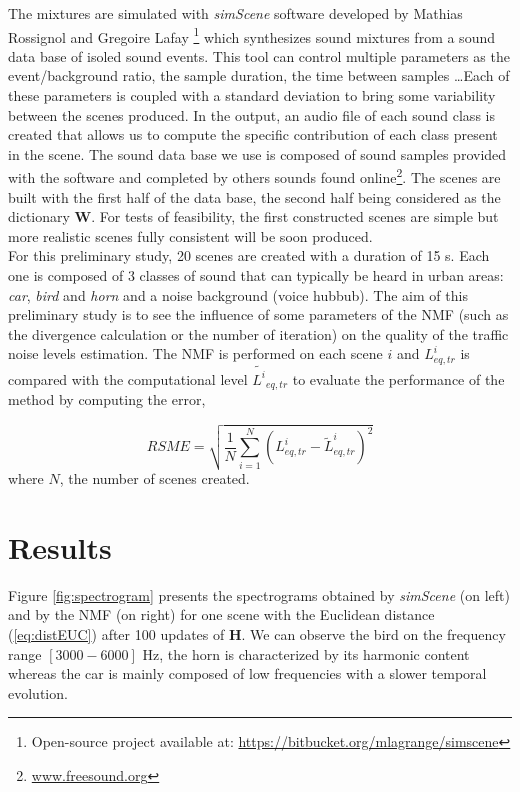 \documentclass{article}
\begin{document}
\begin{sloppy}
The mixtures are simulated with \textit{simScene} software developed by Mathias Rossignol and Gregoire Lafay \cite{simScene}\footnote{Open-source project available at: \url{https://bitbucket.org/mlagrange/simscene}} which synthesizes sound mixtures from a sound data base of isoled sound events. This tool can control multiple parameters as the event/background ratio, the sample duration, the time between samples \dots Each of these parameters is coupled with a standard deviation to bring some variability between the scenes produced. In the output, an audio file of each sound class is created that allows us to compute the specific contribution of each class present in the scene. The sound data base we use is composed of sound samples provided with the software and completed by others sounds found online\footnote{\url{www.freesound.org}}. The scenes are built with the first half of the data base, the second half being considered as the dictionary $\mathbf{W}$. For tests of feasibility, the first constructed scenes are simple but more realistic scenes fully consistent will be soon produced.\\

For this preliminary study, 20 scenes are created with a duration of 15 s. Each one is composed of 3 classes of sound that can typically be heard in urban areas: \textit{car}, \textit{bird} and \textit{horn} and a noise background (voice hubbub). The aim of this preliminary study is to see the influence of some parameters of the NMF (such as the divergence calculation or the number of iteration) on the quality of the traffic noise levels estimation. The NMF is performed on each scene $i$ and $L^i_{eq,tr}$ is compared with the computational level $\tilde{L^i}_{eq,tr}$ to evaluate the performance of the method by computing the error,

\begin{equation}
RSME = \sqrt{\frac{1}{N}\sum_{i = 1}^N(L^i_{eq,tr}-\tilde{L}^i_{eq,tr})^2}
\end{equation}
where $N$, the number of scenes created.

\section{Results}\label{sec:results}

Figure \ref{fig:spectrogram} presents the spectrograms obtained by \textit{simScene} (on left) and by the NMF (on right) for one scene with the Euclidean distance (\ref{eq:distEUC}) after 100 updates of $\mathbf{H}$. We can observe the bird on the frequency range $\left[3000-6000\right]$ Hz, the horn is characterized by its harmonic content whereas the car is mainly composed of low frequencies with a slower temporal evolution.



\end{sloppy}
\end{document}

